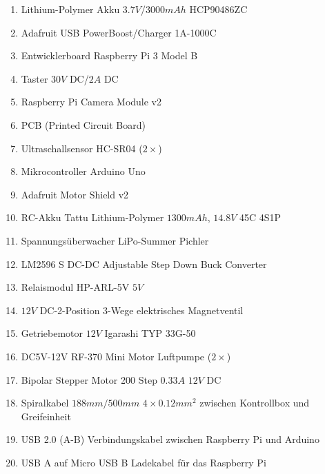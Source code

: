 \begin{enumerate}
    \item Lithium-Polymer Akku $3.7V$/$3000mAh$ HCP90486ZC
    \item Adafruit USB PowerBoost/Charger 1A-1000C
    \item Entwicklerboard Raspberry Pi 3 Model B
    \item Taster $30V$ DC/$2A$ DC 
    \item Raspberry Pi Camera Module v2
    \item PCB (Printed Circuit Board)
    \item Ultraschallsensor HC-SR04 ($2\times$)
    \item Mikrocontroller Arduino Uno \cite{arduino}
    \item Adafruit Motor Shield v2 \cite{motorshield}
    \item RC-Akku Tattu Lithium-Polymer $1300mAh$, $14.8V$ 45C 4S1P \cite{akku}
    \item Spannungsüberwacher LiPo-Summer Pichler \cite{spannungsueberwachung}
    \item LM2596 S DC-DC Adjustable Step Down Buck Converter \cite{stepdownconverter}
    \item Relaismodul HP-ARL-5V $5V$ \cite{relais}
    \item $12V$ DC-2-Position 3-Wege elektrisches Magnetventil \cite{magnetventil}
    \item Getriebemotor $12V$ Igarashi TYP 33G-50
    \item DC5V-12V RF-370 Mini Motor Luftpumpe ($2\times$)
    \item Bipolar Stepper Motor 200 Step $0.33A$ $12V$ DC
    \item Spiralkabel $188mm/500mm$ $4\times0.12mm^2$ zwischen Kontrollbox und Greifeinheit
    \item USB 2.0 (A-B) Verbindungskabel zwischen Raspberry Pi und Arduino
    \item USB A auf Micro USB B Ladekabel für das Raspberry Pi
\end{enumerate}
